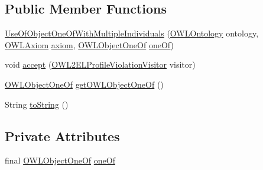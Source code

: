 \subsection*{Public Member Functions}
\begin{DoxyCompactItemize}
\item 
\hyperlink{classorg_1_1semanticweb_1_1owlapi_1_1profiles_1_1_use_of_object_one_of_with_multiple_individuals_a13c2379c64c4dd30a47d86013e58a059}{Use\-Of\-Object\-One\-Of\-With\-Multiple\-Individuals} (\hyperlink{interfaceorg_1_1semanticweb_1_1owlapi_1_1model_1_1_o_w_l_ontology}{O\-W\-L\-Ontology} ontology, \hyperlink{interfaceorg_1_1semanticweb_1_1owlapi_1_1model_1_1_o_w_l_axiom}{O\-W\-L\-Axiom} \hyperlink{classorg_1_1semanticweb_1_1owlapi_1_1profiles_1_1_o_w_l_profile_violation_aa7c8e8910ed3966f64a2c003fb516214}{axiom}, \hyperlink{interfaceorg_1_1semanticweb_1_1owlapi_1_1model_1_1_o_w_l_object_one_of}{O\-W\-L\-Object\-One\-Of} \hyperlink{classorg_1_1semanticweb_1_1owlapi_1_1profiles_1_1_use_of_object_one_of_with_multiple_individuals_a074d978521458b7e7f909a4c11f75261}{one\-Of})
\item 
void \hyperlink{classorg_1_1semanticweb_1_1owlapi_1_1profiles_1_1_use_of_object_one_of_with_multiple_individuals_ada95e356026ce8e7e849045477e949df}{accept} (\hyperlink{interfaceorg_1_1semanticweb_1_1owlapi_1_1profiles_1_1_o_w_l2_e_l_profile_violation_visitor}{O\-W\-L2\-E\-L\-Profile\-Violation\-Visitor} visitor)
\item 
\hyperlink{interfaceorg_1_1semanticweb_1_1owlapi_1_1model_1_1_o_w_l_object_one_of}{O\-W\-L\-Object\-One\-Of} \hyperlink{classorg_1_1semanticweb_1_1owlapi_1_1profiles_1_1_use_of_object_one_of_with_multiple_individuals_af5fdbd87332956a9c26fae5cd7f515a8}{get\-O\-W\-L\-Object\-One\-Of} ()
\item 
String \hyperlink{classorg_1_1semanticweb_1_1owlapi_1_1profiles_1_1_use_of_object_one_of_with_multiple_individuals_af1b5a17e7be936038a250c7f0fb8af5b}{to\-String} ()
\end{DoxyCompactItemize}
\subsection*{Private Attributes}
\begin{DoxyCompactItemize}
\item 
final \hyperlink{interfaceorg_1_1semanticweb_1_1owlapi_1_1model_1_1_o_w_l_object_one_of}{O\-W\-L\-Object\-One\-Of} \hyperlink{classorg_1_1semanticweb_1_1owlapi_1_1profiles_1_1_use_of_object_one_of_with_multiple_individuals_a074d978521458b7e7f909a4c11f75261}{one\-Of}
\end{DoxyCompactItemize}


